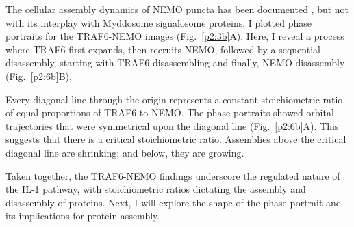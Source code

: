 The cellular assembly dynamics of NEMO puncta has been documented \autocite{Tarantino_2014}\autocite{Du_2022}, but not with its interplay with Myddosome signalosome proteins. I plotted phase portraits for the TRAF6-NEMO images (Fig.~\ref{p2:3b}A). Here, I reveal a process where TRAF6 first expands, then recruits NEMO, followed by a sequential disassembly, starting with TRAF6 disassembling and finally, NEMO disassembly (Fig.~\ref{p2:6b}B).

Every diagonal line through the origin represents a constant stoichiometric ratio of equal proportions of TRAF6 to NEMO. The phase portraits showed orbital trajectories that were symmetrical upon the diagonal line (Fig.~\ref{p2:6b}A). This suggests that there is a critical stoichiometric ratio. Assemblies above the critical diagonal line are shrinking; and below, they are growing.

Taken together, the TRAF6-NEMO findings underscore the regulated nature of the IL-1 pathway, with stoichiometric ratios dictating the assembly and disassembly of proteins. Next, I will explore the shape of the phase portrait and its implications for protein assembly.


